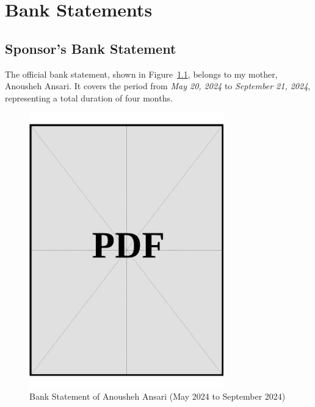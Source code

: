 \chapter{Bank Statements}
\label{sec:bank-statements}

\section{Sponsor's Bank Statement}
\label{sec:sponsor-bank-statement}

\noindent
The official bank statement, shown in Figure~\ref{fig:sponsor-bank-statement}, belongs to my mother, Anousheh Ansari. It covers the period from \textit{May 20, 2024} to \textit{September 21, 2024}, representing a total duration of four months.

\vspace*{\fill}
\begin{figure}[h]
    \centering
    \includegraphics[page=1, width=0.75\textwidth]{../application-docs/sponsor/funds/bank-account/bank-statement.pdf}
    \caption{Bank Statement of Anousheh Ansari (May 2024 to September 2024)}
    \label{fig:sponsor-bank-statement}
\end{figure}
\vspace*{\fill}

